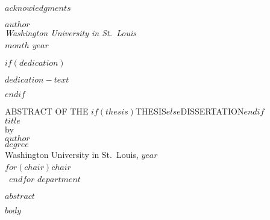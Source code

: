 \documentclass[12pt, oneside, openany]{book}
\begin{document}
$acknowledgments$

\hfill $author$\\
\textit{Washington University in St.~Louis}\\
\textit{$month$ $year$}

$if(dedication)$
    \clearpage
    \null
    \vfill
    \begin{center}
        $dedication-text$
    \end{center}
    \vfill
$endif$

\clearpage
{}
\begin{center}
    ABSTRACT OF THE $if(thesis)$THESIS$else$DISSERTATION$endif$\\
    $title$\\
    by\\
    $author$\\
    $degree$\\
    Washington University in St.~Louis, $year$\\
    $for(chair)$$chair$~\\~$endfor$
    $department$\\
\end{center}
$abstract$

\mainmatter

$body$

\clearpage
\printbibliography[heading=bibintoc]
\end{document}
